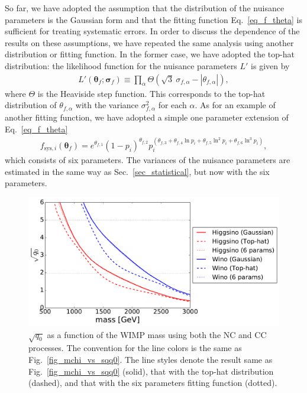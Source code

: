 \documentclass[12pt,twoside,book]{article}
\begin{document}
So far, we have adopted the assumption that the distribution of the
nuisance parameters is the Gaussian form and that the fitting function
Eq.~\eqref{eq_f_theta} is sufficient for treating systematic errors.
In order to discuss the dependence of the results on these
assumptions, we have repeated the same analysis using another
distribution or fitting function.  In the former case, we have adopted
the top-hat distribution: the likelihood function for the nuisance
parameters $L'$ is given by
\begin{align}
 L' (\bm{\theta}_f ; \bm{\sigma}_f) \equiv \prod_\alpha
 \Theta \left( \sqrt{3}\ \sigma_{f,\alpha}
 - \left| \theta_{f,\alpha} \right| \right),
\end{align}
where $\Theta$ is the Heaviside step function.  This corresponds to
the top-hat distribution of $\theta_{f,\alpha}$ with the variance
$\sigma_{f,\alpha}^2$ for each $\alpha$.  As for an example of another
fitting function, we have adopted a simple one parameter extension of
Eq.~\eqref{eq_f_theta}
\begin{align}
 f_{\mathrm{sys}, i} (\bm{\theta}_f) =
 e^{\theta_{f,1}} (1 - p_i)^{\theta_{f,2}}
 p_i^{(\theta_{f,3} + \theta_{f,4} \ln p_i + \theta_{f,5} \ln^2 p_i
 + \theta_{f,6} \ln^3 p_i)},\label{eq_6_param}
\end{align}
which consists of six parameters.
The variances of the nuisance parameters are estimated
in the same way as Sec.~\ref{sec_statistical}, but now with the six parameters.

\begin{figure}[t]
 \centering
 \includegraphics[width=0.7\linewidth]{mchi_vs_sqq0_comp.pdf}
 \caption{$\sqrt{q_0}$ as a function of the WIMP mass using both the
 NC and CC processes.  The convention for the line colors is the same
 as Fig.~\ref{fig_mchi_vs_sqq0}.  The line styles denote the result
 same as Fig.~\ref{fig_mchi_vs_sqq0} (solid), that with the top-hat
 distribution (dashed), and that with the six parameters fitting
 function (dotted).}  \label{fig_mchi_vs_sqq0_comp}
\end{figure}
\end{document}
